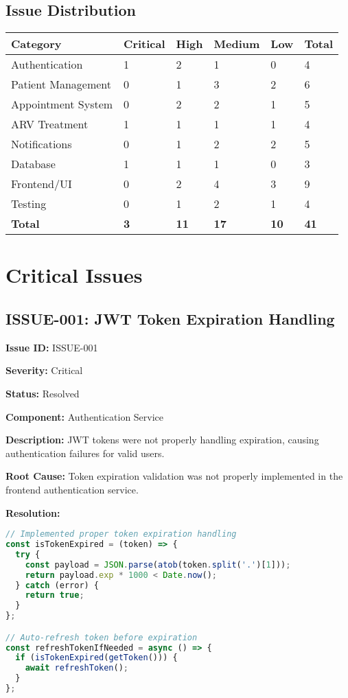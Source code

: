 \documentclass[12pt,a4paper]{article}
\begin{document}
\subsection{Issue Distribution}

\begin{longtable}{|p{3cm}|p{2cm}|p{2cm}|p{2cm}|p{2cm}|p{2cm}|}
\hline
\textbf{Category} & \textbf{Critical} & \textbf{High} & \textbf{Medium} & \textbf{Low} & \textbf{Total} \\
\hline
Authentication & 1 & 2 & 1 & 0 & 4 \\
\hline
Patient Management & 0 & 1 & 3 & 2 & 6 \\
\hline
Appointment System & 0 & 2 & 2 & 1 & 5 \\
\hline
ARV Treatment & 1 & 1 & 1 & 1 & 4 \\
\hline
Notifications & 0 & 1 & 2 & 2 & 5 \\
\hline
Database & 1 & 1 & 1 & 0 & 3 \\
\hline
Frontend/UI & 0 & 2 & 4 & 3 & 9 \\
\hline
Testing & 0 & 1 & 2 & 1 & 4 \\
\hline
\textbf{Total} & \textbf{3} & \textbf{11} & \textbf{17} & \textbf{10} & \textbf{41} \\
\hline
\end{longtable}

\section{Critical Issues}

\subsection{ISSUE-001: JWT Token Expiration Handling}

\textbf{Issue ID:} ISSUE-001

\textbf{Severity:} Critical

\textbf{Status:} Resolved

\textbf{Component:} Authentication Service

\textbf{Description:} JWT tokens were not properly handling expiration, causing authentication failures for valid users.

\textbf{Root Cause:} Token expiration validation was not properly implemented in the frontend authentication service.

\textbf{Resolution:}
\begin{lstlisting}[language=JavaScript, caption=Token Expiration Fix]
// Implemented proper token expiration handling
const isTokenExpired = (token) => {
  try {
    const payload = JSON.parse(atob(token.split('.')[1]));
    return payload.exp * 1000 < Date.now();
  } catch (error) {
    return true;
  }
};

// Auto-refresh token before expiration
const refreshTokenIfNeeded = async () => {
  if (isTokenExpired(getToken())) {
    await refreshToken();
  }
};
\end{lstlisting}
\end{document}
